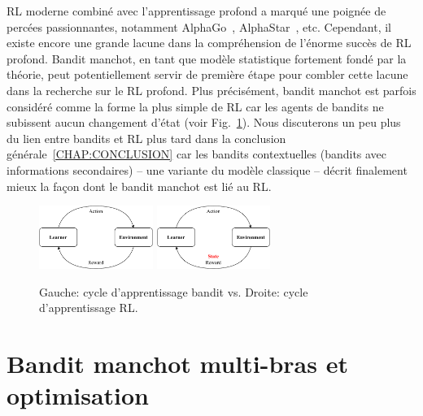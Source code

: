 RL moderne combiné avec l'apprentissage profond a marqué une poignée de percées passionnantes, notamment AlphaGo~\citep{silver2016alphago}, AlphaStar~\citep{vinyals2019alphastar}, etc. Cependant, il existe encore une grande lacune dans la compréhension de l'énorme succès de RL profond. Bandit manchot, en tant que modèle statistique fortement fondé par la théorie, peut potentiellement servir de première étape pour combler cette lacune dans la recherche sur le RL profond. Plus précisément, bandit manchot est parfois considéré comme la forme la plus simple de RL car les agents de bandits ne subissent aucun changement d'état (voir Fig.~\ref{fig:abs.comparison}). Nous discuterons un peu plus du lien entre bandits et RL plus tard dans la conclusion générale~\ref{CHAP:CONCLUSION} car les bandits contextuelles (bandits avec informations secondaires) -- une variante du modèle classique -- décrit finalement mieux la façon dont le bandit manchot est lié au RL.

\begin{figure}[ht]
    \centering
    \includegraphics[width=0.33\textwidth]{Chapter0/img/mab.pdf}
    \includegraphics[width=0.33\textwidth]{Chapter0/img/rl.pdf}
    \caption{Gauche: cycle d'apprentissage bandit vs. Droite: cycle d'apprentissage RL.}
    \label{fig:abs.comparison}
\end{figure}

\section{Bandit manchot multi-bras et optimisation}\label{sec:abs.mab}
    
